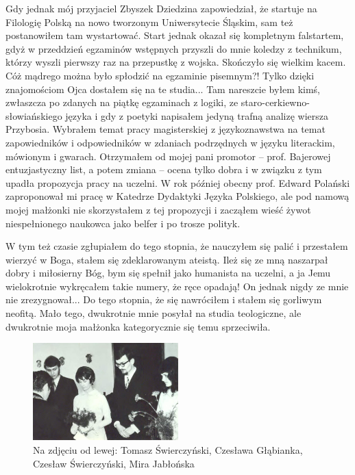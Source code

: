 Gdy jednak mój przyjaciel Zbyszek Dziedzina zapowiedział, że startuje na Filologię Polską na nowo tworzonym Uniwersytecie Śląskim, sam też postanowiłem tam wystartować. Start jednak okazał się kompletnym falstartem, gdyż w przeddzień egzaminów wstępnych przyszli do mnie koledzy z technikum, którzy wyszli pierwszy raz na przepustkę z wojska. Skończyło się wielkim kacem. Cóż mądrego można było spłodzić na egzaminie pisemnym?! Tylko dzięki znajomościom Ojca dostałem się na te studia... Tam nareszcie byłem kimś, zwłaszcza po zdanych na piątkę egzaminach z logiki, ze staro-cerkiewno-słowiańskiego języka i gdy z poetyki napisałem jedyną trafną analizę wiersza Przybosia.  Wybrałem temat pracy magisterskiej z językoznawstwa na temat zapowiedników i odpowiedników w zdaniach podrzędnych w języku literackim, mówionym i gwarach. Otrzymałem od mojej pani promotor – prof. Bajerowej entuzjastyczny list, a potem zmiana – ocena tylko dobra i w związku z tym upadła propozycja pracy na uczelni. W rok później obecny prof. Edward Polański zaproponował mi pracę w Katedrze Dydaktyki Języka Polskiego, ale pod namową mojej małżonki nie skorzystałem z tej propozycji i zacząłem wieść żywot niespełnionego naukowca jako belfer i po trosze polityk.

W tym też czasie zgłupiałem do tego stopnia, że nauczyłem się palić i przestałem wierzyć w Boga, stałem się zdeklarowanym ateistą. Ileż się ze mną naszarpał dobry i miłosierny Bóg, bym się spełnił jako humanista na uczelni, a ja Jemu wielokrotnie wykręcałem takie numery, że ręce opadają! On jednak nigdy ze mnie nie zrezygnował... Do tego stopnia, że się nawróciłem i stałem się gorliwym neofitą. Mało tego, dwukrotnie mnie posyłał na studia teologiczne, ale dwukrotnie moja małżonka kategorycznie się temu sprzeciwiła.
\begin{figure}[!h]
\begin{center}
\includegraphics[width=0.5\textwidth]{photo/czeslawa_czeslaw_swierczynscy_slub_1.jpg}
\caption[Ślub Czesławy i Czesława Świerczyńskich]{Na zdjęciu od lewej: Tomasz Świerczyński, Czesława Głąbianka, Czesław Świerczyński, Mira Jabłońska}
\end{center}
\end{figure}

